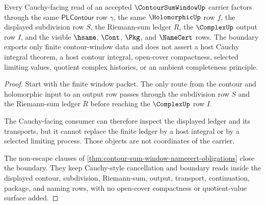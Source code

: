 \begin{theorem}
\label{thm:contour-sum-window-cauchy-boundary}
Every Cauchy-facing read of an accepted $\ContourSumWindowUp$ carrier factors through the same $\mathsf{PLContour}$ row $\gamma$, the same $\HolomorphicUp$ row $f$, the displayed subdivision row $S$, the Riemann-sum ledger $R$, the $\ComplexUp$ output row $I$, and the visible $\hsame$, $\Cont$, $\Pkg$, and $\NameCert$ rows. The boundary exports only finite contour-window data and does not assert a host Cauchy integral theorem, a host contour integral, open-cover compactness, selected limiting values, quotient complex histories, or an ambient completeness principle.
\end{theorem}
\begin{proof}
Start with the finite window packet. The only route from the contour and holomorphic input to an output row passes through the subdivision row $S$ and the Riemann-sum ledger $R$ before reaching the $\ComplexUp$ row $I$.

The Cauchy-facing consumer can therefore inspect the displayed ledger and its transports, but it cannot replace the finite ledger by a host integral or by a selected limiting process. Those objects are not coordinates of the carrier.

The non-escape clauses of \autoref{thm:contour-sum-window-namecert-obligations} close the boundary. They keep Cauchy-style cancellation and boundary reads inside the displayed contour, subdivision, Riemann-sum, output, transport, continuation, package, and naming rows, with no open-cover compactness or quotient-value surface added.
\end{proof}

